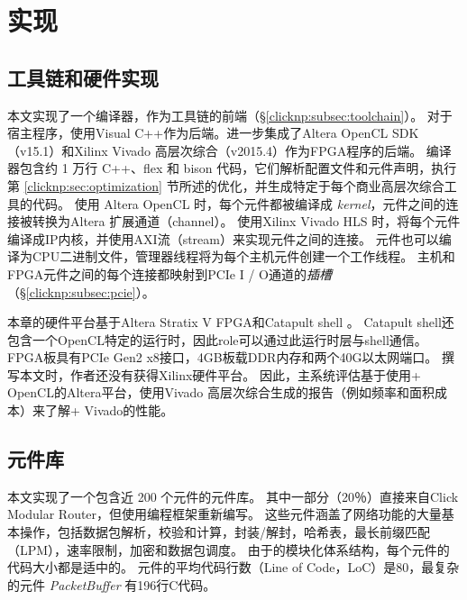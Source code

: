 \section{实现}
\label{clicknp:sec:impl}

\subsection{\name 工具链和硬件实现}

本文实现了一个\name 编译器，作为\name 工具链的前端（\S \ref {clicknp:subsec:toolchain}）。
对于宿主程序，使用Visual C++作为后端。进一步集成了Altera OpenCL SDK（v15.1）\cite {aoc}和Xilinx Vivado 高层次综合（v2015.4）\cite {vivado}作为FPGA程序的后端。
\name 编译器包含约 1 万行 C++、flex 和 bison 代码，它们解析配置文件和元件声明，执行第 \ref {clicknp:sec:optimization} 节所述的优化，并生成特定于每个商业高层次综合工具的代码。
使用 Altera OpenCL 时，每个\name 元件都被编译成 \textit {kernel}，元件之间的连接被转换为Altera 扩展通道（channel）。
使用Xilinx Vivado HLS 时，将每个元件编译成IP内核，并使用AXI流（stream）来实现元件之间的连接。
元件也可以编译为CPU二进制文件，管理器线程将为每个主机元件创建一个工作线程。
主机和FPGA元件之间的每个连接都映射到PCIe I / O通道的\textit {插槽}（\S \ref {clicknp:subsec:pcie}）。

本章的硬件平台基于Altera Stratix V FPGA和Catapult shell \cite {putnam2014reconfigurable}。
Catapult shell还包含一个OpenCL特定的运行时，因此\name role可以通过此运行时层与shell通信。
FPGA板具有PCIe Gen2 x8接口，4GB板载DDR内存和两个40G以太网端口。
撰写本文时，作者还没有获得Xilinx硬件平台。
因此，主系统评估基于使用\name + OpenCL的Altera平台，使用Vivado 高层次综合生成的报告（例如频率和面积成本）来了解\name + Vivado的性能。



\subsection{\name 元件库}
\label{clicknp:subsec:lib}

本文实现了一个包含近 200 个元件的\name 元件库。
其中一部分（20％）直接来自Click Modular Router，但使用\name 编程框架重新编写。
这些元件涵盖了网络功能的大量基本操作，包括数据包解析，校验和计算，封装/解封，哈希表，最长前缀匹配（LPM），速率限制，加密和数据包调度。
由于\name 的模块化体系结构，每个元件的代码大小都是适中的。
元件的平均代码行数（Line of Code，LoC）是80，最复杂的元件 \textit {PacketBuffer} 有196行C代码。


